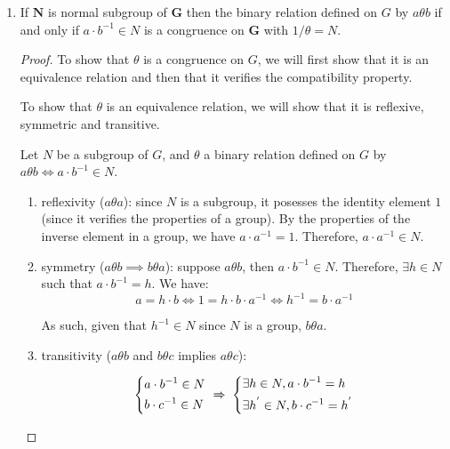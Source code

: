 \begin{example}
\begin{enumerate}
\begin{proof}
    Let $a \cdot b^{-1} \in 1 / \theta$ so $a \cdot b^{-1} \: \theta \: 1$. By
    the compatibility property, $a \cdot b^{-1} \cdot b \: \theta \: 1 \cdot
    b$. Therefore, by the properties of the equivalence relation, $a \theta b$.

    As such, we have proven $a \theta b \iff a \cdot b^{-1} \in 1 / \theta$.
  \end{proof}

\item If $\boldsymbol{N}$ is normal subgroup of $\boldsymbol{G}$ then the
  binary relation defined on $G$ by $a \theta b$ if and only if
  $a \cdot b^{-1} \in N$ is a congruence on $\boldsymbol{G}$ with $1 / \theta = N$.

  \begin{proof}
    To show that $\theta$ is a congruence on $G$, we will first show that it is
    an equivalence relation and then that it verifies the compatibility property.

    To show that $\theta$ is an equivalence relation, we will show that it is
    reflexive, symmetric and transitive.

    Let $N$ be a subgroup of $G$, and $\theta$ a binary relation defined on $G$
    by $a \theta b \iff a \cdot b^{-1} \in N$.

    \begin{enumerate}
    \item reflexivity ($a \theta a$): since $N$ is a subgroup, it posesses the
      identity element $1$ (since it verifies the properties of a group). By the
      properties of the inverse element in a group, we have
      $a \cdot a^{-1} = 1$. Therefore, $a \cdot a^{-1} \in N$.
    \item symmetry ($a \theta b \implies b \theta a$): suppose $a \theta b$,
      then $a \cdot b^{-1} \in N$. Therefore, $\exists h \in N$ such that
      $a \cdot b^{-1} = h$. We have:
      $$a = h \cdot b \iff 1 = h \cdot b \cdot a^{-1} \iff h^{-1} = b \cdot a^{-1}$$

      As such, given that $h^{-1} \in N$ since $N$ is a group, $b \theta a$.
    \item transitivity ($a \theta b$ and $b \theta c$ implies $a \theta c$):

      \begin{equation}
        \begin{dcases}
          a \cdot b^{-1} \in N   \\
          b \cdot c^{-1} \in N \end{dcases}
        \; \xRightarrow{} \;
        \begin{dcases}
          \exists h \in N, a \cdot b^{-1} = h \\
          \exists h^{'} \in N, b \cdot c^{-1} = h^{'}\end{dcases}
      \end{equation}


\end{enumerate}
\end{proof}
\end{enumerate}
\end{example}
